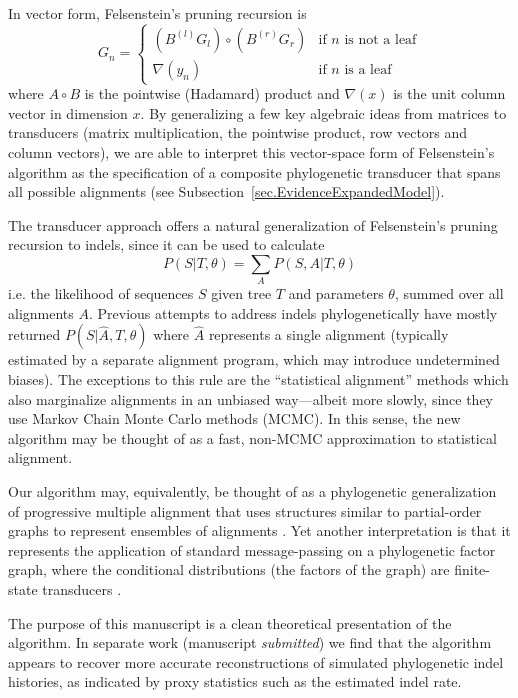 \documentclass{article}
\newcommand{\secref}[1]{Subsection~\ref{sec.#1}}
\newcommand\fork{\circ}
\newcommand\recognize{\nabla}
\begin{document}
In vector form, Felsenstein's pruning recursion is
\[
G_n = \left\{
\begin{array}{ll}
\left( B^{(l)} G_l \right) \fork \left( B^{(r)} G_r \right) & \mbox{if $n$ is not a leaf} \\
\recognize(y_n) & \mbox{if $n$ is a leaf}
\end{array}
\right.
\]
where $A \fork B$ is the pointwise (Hadamard) product
and $\recognize(x)$ is the unit column vector in dimension $x$.
By generalizing a few key algebraic ideas from matrices to transducers
(matrix multiplication, the pointwise product, row vectors and column vectors),
we are able to interpret this vector-space form of Felsenstein's algorithm
as the specification of a composite phylogenetic transducer
that spans all possible alignments (see \secref{EvidenceExpandedModel}).

The transducer approach offers a natural generalization of Felsenstein's pruning recursion to indels,
since it can be used to calculate
\[
P(S|T,\theta) = \sum_A P(S,A|T,\theta)
\]
i.e. the likelihood of sequences $S$ given tree $T$ and parameters $\theta$, summed over all alignments $A$.
Previous attempts to address indels phylogenetically have mostly returned $P(S|\hat{A},T,\theta)$ where $\hat{A}$ represents a single alignment
(typically estimated by a separate alignment program, which may introduce undetermined biases).
The exceptions to this rule are the ``statistical alignment'' methods \cite{HeinEtal2000,Hein2001,HolmesBruno2001,Metzler2003,SuchardRedelings2006}
which also marginalize alignments in an unbiased way---albeit more slowly, since they use Markov Chain Monte Carlo methods (MCMC).
In this sense, the new algorithm may be thought of as a fast, non-MCMC approximation to statistical alignment.

Our algorithm may, equivalently, be thought of as a phylogenetic generalization of progressive multiple alignment \cite{HigginsSharp89}
that uses structures similar to partial-order graphs to represent ensembles of alignments \cite{LeeGrassoSharlow2002}.
Yet another interpretation is that it represents the application of standard message-passing on a phylogenetic factor graph,
where the conditional distributions (the factors of the graph) are finite-state transducers \cite{KschischangEtAl98}.

The purpose of this manuscript is a clean theoretical presentation of the algorithm.
In separate work (manuscript {\em submitted}) we find that the algorithm appears to recover more accurate reconstructions of simulated phylogenetic indel histories,
as indicated by proxy statistics such as the estimated indel rate.
\end{document}
